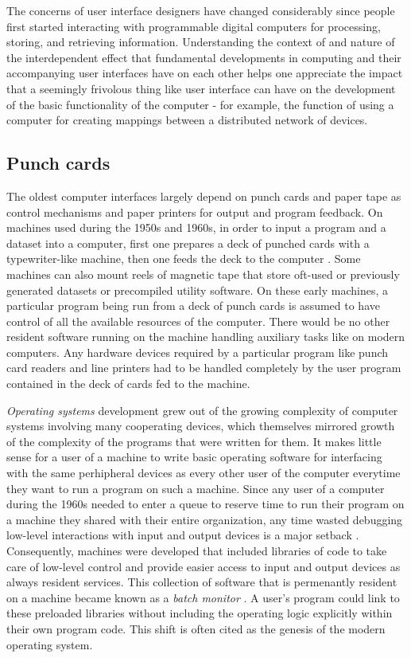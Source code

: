 The concerns of user interface designers have changed considerably since people first started interacting with programmable digital computers for processing, storing, and retrieving information. Understanding the context of and nature of the interdependent effect that fundamental developments in computing and their accompanying user interfaces have on each other helps one appreciate the impact that a seemingly frivolous thing like user interface can have on the development of the basic functionality of the computer - for example, the function  of using a computer for creating mappings between a distributed network of devices.  

\subsection{Punch cards}

The oldest computer interfaces largely depend on punch cards and paper tape as control mechanisms and paper printers for output and program feedback. On machines used during the 1950s and 1960s, in order to input a program and a dataset into a computer, first one prepares a deck of punched cards with a typewriter-like machine, then one feeds the deck to the computer \cite{oshistory2011}. Some machines can also mount reels of magnetic tape that store oft-used or previously generated datasets or precompiled utility software. On these early machines, a particular program being run from a deck of punch cards is assumed to have control of all the available resources of the computer. There would be no other resident software running on the machine handling auxiliary tasks like on modern computers. Any hardware devices required by a particular program like punch card readers and line printers had to be handled completely by the user program contained in the deck of cards fed to the machine. 

\emph{Operating systems} development grew out of the growing complexity of computer systems involving many cooperating devices, which themselves mirrored growth of the complexity of the programs that were written for them. It makes little sense for a user of a machine to write basic operating software for interfacing with the same perhipheral devices as every other user of the computer everytime they want to run a program on such a machine. Since any user of a computer during the 1960s needed to enter a queue to reserve time to run their program on a machine they shared with their entire organization, any time wasted debugging low-level interactions with input and output devices is a major setback \cite{operatingsystems2010}. Consequently, machines were developed that included libraries of code to take care of low-level control and provide easier access to input and output devices as always resident services. This collection of software that is permenantly resident on a machine became known as a \emph{batch monitor} \cite{os2000}. A user's program could link to these preloaded libraries without including the operating logic explicitly within their own program code. This shift is often cited as the genesis of the modern operating system.

